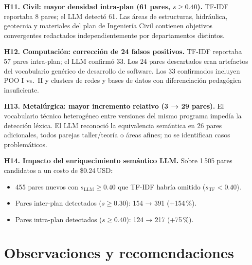 \documentclass[11pt,a4paper]{article}
\begin{document}
\begin{hallazgo}
\textbf{H11. Civil: mayor densidad intra-plan (61 pares, $s \geq 0.40$).}
TF-IDF reportaba 8 pares; el LLM detectó 61.
Las áreas de estructuras, hidráulica, geotecnia y materiales del plan de Ingeniería Civil contienen objetivos convergentes redactados independientemente por departamentos distintos.
\end{hallazgo}

\begin{hallazgo}
\textbf{H12. Computación: corrección de 24 falsos positivos.}
TF-IDF reportaba 57 pares intra-plan; el LLM confirmó 33.
Los 24 pares descartados eran artefactos del vocabulario genérico de desarrollo de software.
Los 33 confirmados incluyen POO I vs.\ II y clusters de redes y bases de datos con diferenciación pedagógica insuficiente.
\end{hallazgo}

\begin{hallazgo}
\textbf{H13. Metalúrgica: mayor incremento relativo (3 → 29 pares).}
El vocabulario técnico heterogéneo entre versiones del mismo programa impedía la detección léxica.
El LLM reconoció la equivalencia semántica en 26 pares adicionales, todos parejas taller/teoría o áreas afines; no se identifican casos problemáticos.
\end{hallazgo}

\begin{hallazgo}
\textbf{H14. Impacto del enriquecimiento semántico LLM.}
Sobre 1\,505 pares candidatos a un costo de \$0.24\,USD:
\begin{itemize}[nosep,leftmargin=1.5em]
  \item 455 pares nuevos con $s_{\mathrm{LLM}} \geq 0.40$ que TF-IDF habría omitido ($s_{\mathrm{TF}} < 0.40$).
  \item Pares inter-plan detectados ($s \geq 0.30$): 154 → 391 (+154\,\%).
  \item Pares intra-plan detectados ($s \geq 0.40$): 124 → 217 (+75\,\%).
\end{itemize}
\end{hallazgo}

\section{Observaciones y recomendaciones}
\end{document}
